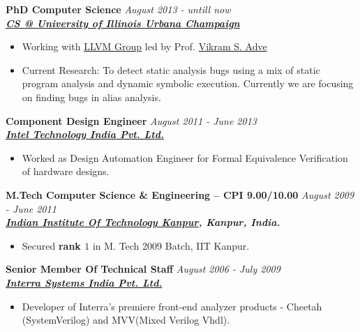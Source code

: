 \documentclass[9pt]{article}
\newenvironment{changemargin}[2]{%
  \begin{list}{}{%
    \setlength{\topsep}{0pt}%
    \setlength{\leftmargin}{#1}%
    \setlength{\rightmargin}{#2}%
    \setlength{\listparindent}{\parindent}%
    \setlength{\itemindent}{\parindent}%
    \setlength{\parsep}{\parskip}%
  }%
  \item[]}{\end{list}
}
\newenvironment{body} {
	\vspace*{-16pt}
	\begin{changemargin}{-0.25in}{-0.5in}
  }	
	{\end{changemargin}
}
\begin{document}
\begin{body}
	\vspace{14pt}
	\textbf{PhD Computer Science }{} \hfill \emph{August 2013 - untill now}{} \\
	\textbf{\emph{\href{http://cs.illinois.edu/}{CS @ University of Illinois Urbana Champaign}}{}} \\
	\begin{itemize} \itemsep -0pt
	  \item  Working with \href{http://llvm.org/}{ LLVM Group} led by Prof. \href{http://web.engr.illinois.edu/~vadve/Home.html}{Vikram S. Adve}
          \item  Current Research: To detect static analysis bugs using a mix of static program analysis and 
                dynamic symbolic execution. Currently we are focusing on finding bugs in alias analysis.
        \end{itemize}


 \medskip
        \textbf{Component Design Engineer} \hfill \emph{August 2011 - June 2013}\\
	\textbf{\emph{\href{http://www.intel.in/content/www/in/en/homepage.html}{Intel Technology India Pvt. Ltd.}}}
	\begin{itemize} \itemsep -0pt
                \item Worked as Design Automation Engineer for Formal Equivalence Verification of hardware designs.
	\end{itemize}

 \medskip
	\textbf{M.Tech Computer Science \& Engineering -- CPI 9.00/10.00}{} \hfill \emph{August 2009 - June 2011}{} \\
	\textbf{\emph{\href{http://www.iitk.ac.in/}{Indian Institute Of Technology Kanpur}, Kanpur, India.}{}} \\
	\begin{itemize} \itemsep -0pt
		\item Secured \textbf{rank $1$} in M. Tech 2009 Batch, IIT Kanpur.
	\end{itemize}

 \medskip
        \textbf{Senior Member Of Technical Staff} \hfill \emph{August 2006 - July 2009}\\
       	\textbf{\emph{\href{http://www.interrasystems.com/}{Interra Systems India Pvt. Ltd.}}}
	\begin{itemize} \itemsep -0pt
		\item Developer of Interra's premiere front-end analyzer products - Cheetah (SystemVerilog) and MVV(Mixed Verilog Vhdl).
	\end{itemize}


\end{body}
\end{document}
